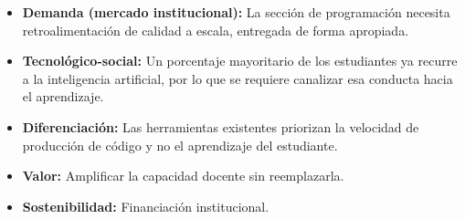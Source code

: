 \documentclass[letterpaper, 10 pt, conference]{ieeeconf}
\begin{document}
\begin{itemize}
	\item \textbf{Demanda (mercado institucional):} La sección de programación necesita retroalimentación de calidad a escala, entregada de forma apropiada.
	\item \textbf{Tecnológico-social:} Un porcentaje mayoritario de los estudiantes ya recurre a la inteligencia artificial, por lo que se requiere canalizar esa conducta hacia el aprendizaje.
	\item \textbf{Diferenciación:} Las herramientas existentes priorizan la velocidad de producción de código y no el aprendizaje del estudiante.
	\item \textbf{Valor:} Amplificar la capacidad docente sin reemplazarla.
	\item \textbf{Sostenibilidad:} Financiación institucional.
\end{itemize}


\addtolength{\textheight}{-12cm}   %







\end{document}
